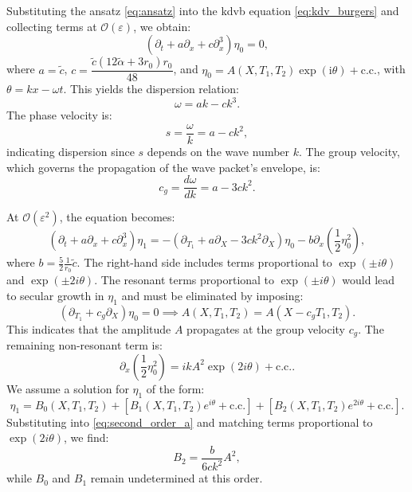 \documentclass[alpha-refs, 12pt]{wiley-article}
\renewcommand{\O}{\mathcal{O}}
\newcommand{\ui}{\mathrm{i}}
\newcommand{\eps}{\varepsilon}
\begin{document}
Substituting the ansatz \eqref{eq:ansatz} into the \acrshort{kdvb} equation \eqref{eq:kdv_burgers} and collecting terms at $\O(\eps)$, we obtain:
\begin{equation}\label{eq:leading_order}
  \left( \partial_t + a \partial_x + c \partial_x^3 \right) \eta_0 = 0,
\end{equation}
where $a = \tilde{c}$, $c = \dfrac{\tilde{c} (12 \tilde{\alpha} + 3 r_0) r_0}{48}$, and $\eta_0 = A(X, T_1, T_2) \exp(\ui \theta) + \text{c.c.}$, with $\theta = k x - \omega t$. This yields the dispersion relation:
\begin{equation}\label{eq:dispersion}
  \omega = a k - c k^3.
\end{equation}
The phase velocity is:
\[
s = \frac{\omega}{k} = a - c k^2,
\]
indicating dispersion since $s$ depends on the wave number $k$. The group velocity, which governs the propagation of the wave packet's envelope, is:
\[
  c_g = \frac{d \omega}{d k} = a - 3 c k^2.
\]

At $\O(\eps^2)$, the equation becomes:
\begin{equation}\label{eq:second_order_a}
  \left( \partial_t + a \partial_x + c \partial_x^3 \right) \eta_1 = - \left( \partial_{T_1} + a \partial_X - 3 c k^2 \partial_X \right) \eta_0 - b \partial_x \left( \frac{1}{2} \eta_0^2 \right),
\end{equation}
where $b = \frac{5}{2} \frac{1}{r_0} \tilde{c}$. The right-hand side includes terms proportional to $\exp(\pm i \theta)$ and $\exp(\pm 2 i \theta)$. The resonant terms proportional to $\exp(\pm i \theta)$ would lead to secular growth in $\eta_1$ and must be eliminated by imposing:
\begin{equation}\label{eq:secular_elimination}
  \left( \partial_{T_1} + c_g \partial_X \right) \eta_0 = 0 \implies A(X, T_1, T_2) = A(X - c_g T_1, T_2).
\end{equation}
This indicates that the amplitude $A$ propagates at the group velocity $c_g$. The remaining non-resonant term is:
\[
  \partial_x \left( \frac{1}{2} \eta_0^2 \right) = i k A^2 \exp(2 i \theta) + \text{c.c.}.
\]
We assume a solution for $\eta_1$ of the form:
\begin{equation}\label{eq:eta1_form}
  \eta_1 = B_0(X, T_1, T_2) + \left[ B_1(X, T_1, T_2) e^{i \theta} + \text{c.c.} \right] + \left[ B_2(X, T_1, T_2) e^{2 i \theta} + \text{c.c.} \right].
\end{equation}
Substituting into \eqref{eq:second_order_a} and matching terms proportional to $\exp(2 i \theta)$, we find:
\begin{equation}\label{eq:B2_solution}
  B_2 = \frac{b}{6 c k^2} A^2,
\end{equation}
while $B_0$ and $B_1$ remain undetermined at this order.
\end{document}
